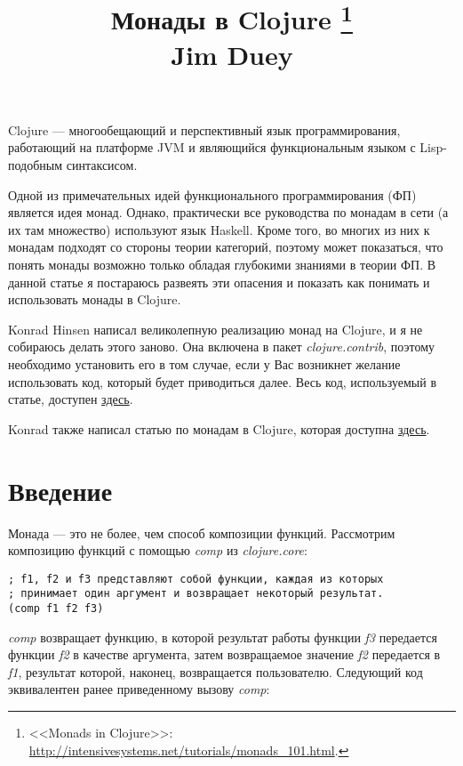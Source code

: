 \documentclass[a4paper,12pt]{article}
\title{Монады в Clojure
\footnote{<<Monads in Clojure>>: \href{http://intensivesystems.net/tutorials/monads_101.html}
{http://intensivesystems.net/tutorials/monads\_101.html}.}\\ \vspace{1.0cm} Jim Duey}
\newcommand{\cl}[1] {{\it #1}}
\begin{document}
\maketitle

Clojure --- многообещающий и перспективный язык программирования, работающий на платформе JVM 
и являющийся функциональным языком с Lisp-подобным синтаксисом. 

Одной из примечательных идей функционального программирования (ФП) является идея монад. 
Однако, практически все руководства по монадам в сети (а их там множество) используют
язык Haskell. Кроме того, во многих из них к монадам подходят со стороны
теории категорий, поэтому может показаться, что понять монады возможно только обладая
глубокими знаниями в теории ФП. В данной статье я постараюсь развеять эти опасения и
показать как понимать и использовать монады в Clojure.

Konrad Hinsen написал великолепную реализацию монад на Clojure, и я не собираюсь делать
этого заново. Она включена в пакет \cl{clojure.contrib}, поэтому необходимо установить его
в том случае, если у Вас возникнет желание использовать код, который будет приводиться далее. 
Весь код, используемый в статье, доступен \href{http://intensivesystems.net/tutorials/code/monads\_101.clj}
{здесь}.

Konrad также написал статью по монадам в Clojure, которая доступна 
\href{http://onclojure.com/2009/03/05/a-monad-tutorial-for-clojure-programmers-part-1/}{здесь}.



\section{Введение}\label{first-looks}
Монада --- это не более, чем способ композиции функций. 
Рассмотрим композицию функций с помощью \cl{comp} из \cl{clojure.core}:

\begin{verbatim}
; f1, f2 и f3 представляют собой функции, каждая из которых  
; принимает один аргумент и возвращает некоторый результат.
(comp f1 f2 f3)
\end{verbatim}
\cl{comp} возвращает функцию, в которой результат работы функции \cl{f3} передается функции \cl{f2}
в качестве аргумента, затем возвращаемое значение \cl{f2} передается в \cl{f1}, результат которой, наконец,
возвращается пользователю. Следующий код эквивалентен ранее приведенному вызову \cl{comp}:
\end{document}
